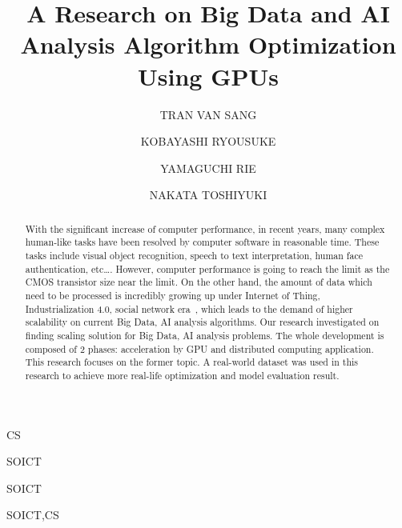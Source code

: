 \documentclass[English]{dicomopapers}
\begin{document}
\title{A Research on Big Data and AI Analysis Algorithm Optimization Using GPUs}


\author{TRAN VAN SANG}{CS}
\author{KOBAYASHI RYOUSUKE}{SOICT}
\author{YAMAGUCHI RIE}{SOICT}
\author{NAKATA TOSHIYUKI}{SOICT,CS}

\begin{abstract}
With the significant increase of computer performance, in recent years, many complex human-like tasks have been resolved by computer software in reasonable time. These tasks include visual object recognition, speech to text interpretation, human face authentication, etc\ldots. However, computer performance is going to reach the limit as the CMOS transistor size near the limit. On the other hand, the amount of data which need to be processed is incredibly growing up under Internet of Thing, Industrialization 4.0, social network era~\cite{lohr2012age}, which leads to the demand of higher scalability on current Big Data, AI analysis algorithms. Our research investigated on finding scaling solution for Big Data, AI analysis problems. The whole development is composed of 2 phases: acceleration by GPU and distributed computing application. This research focuses on the former topic. A real-world dataset was used in this research to achieve more real-life optimization and model evaluation result.
\end{abstract}

\maketitle

\end{document}

